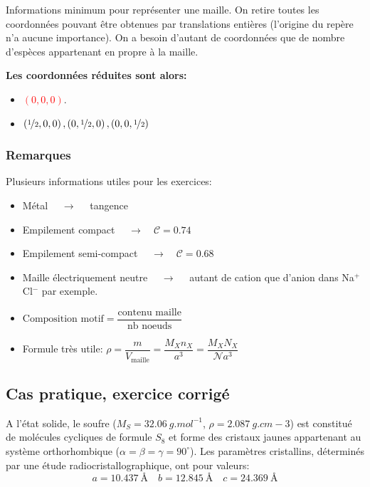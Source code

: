 \documentclass{article}
\begin{document}
Informations minimum pour représenter une maille.
On retire toutes les coordonnées pouvant être obtenues par translations entières (l'origine du repère n'a aucune importance).
On a besoin d'autant de coordonnées que de nombre d'espèces appartenant en propre à la maille.

\vspace{3mm}
\noindent\textbf{Les coordonnées réduites sont alors:}
\vspace{3mm}
\begin{itemize}[label=$\ast$]
    \item \textcolor{red}{\Large $\left(0, 0, 0\right)$}.
    \item \textcolor{blue}{\Large $\left(\nicefrac{1}{2}, 0, 0\right), \left(0, \nicefrac{1}{2}, 0\right), \left(0, 0, \nicefrac{1}{2}\right)$}
\end{itemize}

\vspace{0.8cm}

\subsubsection{Remarques}

\noindent Plusieurs informations utiles pour les exercices:
\begin{itemize}[label=$\ast$]
    \item Métal $\quad \rightarrow \quad$ tangence
    \item Empilement compact $\quad \rightarrow \quad \mathcal{C} = 0.74$
    \item Empilement semi-compact $\quad \rightarrow \quad \mathcal{C} = 0.68$
    \item Maille électriquement neutre $\quad \rightarrow \quad$ autant de cation que d'anion dans Na$^+$Cl$^-$ par exemple.
    \item $\text{Composition motif} = \dfrac{\text{contenu maille}}{\text{nb noeuds}}$
    \item Formule très utile: $\rho = \dfrac{m}{V_{\text{maille}}} = \dfrac{M_X n_X}{a^3} = \dfrac{M_X N_X}{\mathcal{N}a^3}$
\end{itemize}


\subsection{Cas pratique, exercice corrigé}

A l'état solide, le soufre ($M_S = \qty{32.06}{g.mol^{-1}}$, $\rho = \qty{2.087}{g.cm-3}$)
est constitué de molécules cycliques de formule $S_8$ et forme des cristaux jaunes appartenant au système orthorhombique 
($\alpha=\beta=\gamma=90^{\circ}$). Les paramètres cristallins, déterminés par une
étude radiocristallographique, ont pour valeurs:
$$a = \qty{10.437}{\angstrom} \quad b = \qty{12.845}{\angstrom} \quad c = \qty{24.369}{\angstrom}$$ 
\end{document}
